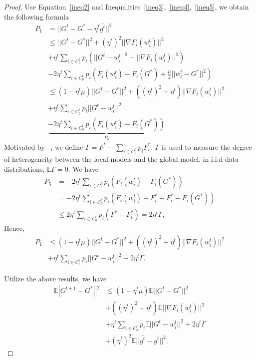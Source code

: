 \begin{proof}
Use Equation~\ref{ineq2} and Inequalities~\ref{ineq3},~\ref{ineq4},~\ref{ineq5}, we obtain the following formula
\begin{equation*}
    \begin{split}
	   P_1  
        & = ||G^t-G^*-\eta^t \bar{g^t}||^2 \\
	& \leq ||G^t-G^*||^2+(\eta^t)^2||\nabla F_i(w_i^t)||^2 \\
        & +\eta^t\sum\limits_{i \in C_b^t}p_i(||G^t-w_i^t||^2
         +||\nabla F_i(w_i^t)||^2) \\
	& - 2\eta^t\sum\limits_{i \in C_b^t}p_i(F_i(w_i^t)-F_i(G^*)+\frac{\mu}{2}||w_i^t-G^*||^2)\\
	& \leq (1-\eta^t\mu)||G^t-G^*||^2+((\eta^t)^2+\eta^t)||\nabla F_i(w_i^t)||^2\\
	& + \eta^t\sum\limits_{i \in C_b^t}p_i||G^t-w_i^t||^2 \\
        & \underbrace{- 2\eta^t\sum\limits_{i \in C_b^t}p_i(F_i(w_i^t)-F_i(G^*))}_{P_5}.
    \end{split} 
\end{equation*}
Motivated by ~\cite{li2019convergence}, we define $\Gamma=F^*-\sum\limits_{i\in C_b^t}p_iF_i^*$. $\Gamma$ is used to measure the degree of heterogeneity between the local models and the global model, in i.i.d data distributions, $\mathbb{E}\Gamma=0$. We have 
\begin{equation*}
    \begin{split}
	P_5 
	& = - 2\eta^t\sum\limits_{i \in C_b^t}p_i(F_i(w_i^t)-F_i(G^*))\\
	& = - 2\eta^t\sum\limits_{i \in C_b^t}p_i(F_i(w_i^t)-F_i^*+F_i^*-F_i(G^*))\\
	& \leq  2\eta^t\sum\limits_{i \in C_b^t}p_i(F^*-F_i^*)=2\eta^t \Gamma, 
    \end{split} 
\end{equation*}
Hence,
\begin{equation*}
    \begin{split}
	P_1
	& \leq (1-\eta^t\mu)||G^t-G^*||^2+((\eta^t)^2+\eta^t)||\nabla F_i(w_i^t)||^2\\
	& + \eta^t\sum\limits_{i \in C_b^t}p_i||G^t-w_i^t||^2 +2\eta^t \Gamma.
    \end{split} 
\end{equation*}

Utilize the above results, we have
\begin{equation}
    \begin{split}\label{ineq6}
	\mathbb{E}|G^{t+1}-G^*||^2
	& \leq (1-\eta^t\mu)\mathbb{E}||G^t-G^*||^2 \\
        & + ((\eta^t)^2+\eta^t)\mathbb{E}||\nabla F_i(w_i^t)||^2\\
	& + \eta^t\sum\limits_{i \in C_b^t}p_i\mathbb{E}||G^t-w_i^t||^2 +2\eta^t \Gamma \\
        & + (\eta^t)^2\mathbb{E}||\bar{g^t}-g^t||^2.
    \end{split}
\end{equation}


\end{proof}
